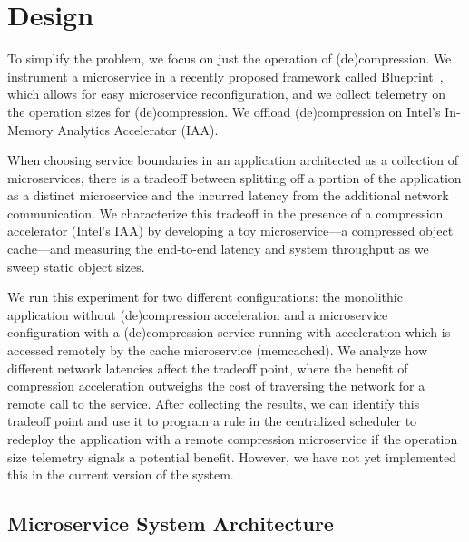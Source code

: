 \section{Design}

To simplify the problem, we focus on just the operation of (de)compression.
We instrument a microservice in a recently proposed framework called Blueprint~\cite{anand2023blueprint}, which allows for easy microservice reconfiguration, and we collect telemetry on the operation sizes for (de)compression.
We offload (de)compression on Intel's In-Memory Analytics Accelerator (IAA).

When choosing service boundaries in an application architected as a collection of microservices, there is a tradeoff between splitting off a portion of the application as a distinct microservice and the incurred latency from the additional network communication.
We characterize this tradeoff in the presence of a compression accelerator (Intel's IAA) by developing a toy microservice---a compressed object cache---and measuring the end-to-end latency and system throughput as we sweep static object sizes.

We run this experiment for two different configurations: the monolithic application without (de)compression acceleration and a microservice configuration with a (de)compression service running with acceleration which is accessed remotely by the cache microservice (memcached).
We analyze how different network latencies affect the tradeoff point, where the benefit of compression acceleration outweighs the cost of traversing the network for a remote call to the service.
After collecting the results, we can identify this tradeoff point and use it to program a rule in the centralized scheduler to redeploy the application with a remote compression microservice if the operation size telemetry signals a potential benefit. However, we have not yet implemented this in the current version of the system.

\subsection{Microservice System Architecture}

